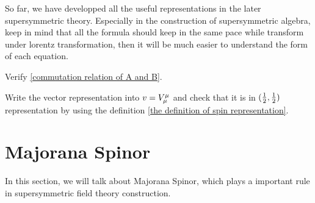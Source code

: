 So far, we have developped all the useful representations in the later supersymmetric theory. Especially in the construction of supersymmetric algebra, keep in mind that all the formula should keep in the same pace while transform under lorentz transformation, then it will be much easier to understand the form of each equation.

\begin{Exe}\qquad
	
	Verify \eqref{commutation relation of A and B}.
\end{Exe}  

\begin{Exe}\qquad
	
	Write the vector representation into $v=V^{\mu}_{\mu}$ and check that it is in $(\frac{1}{2},\frac{1}{2})$ representation by using the definition \eqref{the definition of spin representation}. 
\end{Exe}

\section{Majorana Spinor}

In this section, we will talk about Majorana Spinor, which plays a important rule in supersymmetric field theory construction. 